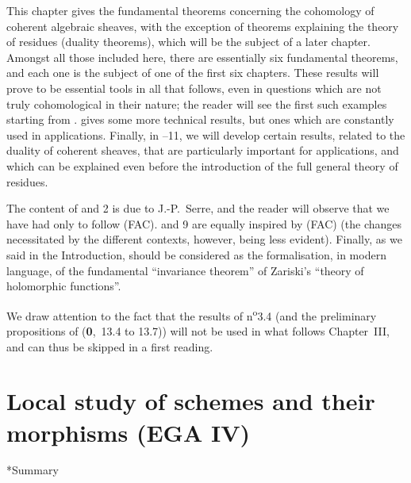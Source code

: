 \documentclass[openany,oneside]{amsbook}
\makeatletter
\theoremstyle{ega-env-style}
\theoremstyle{ega-thm-env-style}
\theoremstyle{ega-defn-env-style}
\def\section{\@startsection{section}{1}%
  \z@{.7\linespacing\@plus\linespacing}{.5\linespacing}%
  {\normalfont\bfseries\Large\scshape\centering}}
\makeatother
\begin{document}
This chapter gives the fundamental theorems concerning the cohomology of coherent algebraic sheaves, with the exception of theorems explaining the theory of residues (duality theorems), which will be the subject of a later chapter.
Amongst all those included here, there are essentially six fundamental theorems, and each one is the subject of one of the first six chapters.
These results will prove to be essential tools in all that follows, even in questions which are not truly cohomological in their nature;
the reader will see the first such examples starting from .
 gives some more technical results, but ones which are constantly used in applications.
Finally, in \textsection{}--11, we will develop certain results, related to the duality of coherent sheaves, that are particularly important for applications, and which can be explained even before the introduction of the full general theory of residues.

The content of \textsection{} and 2 is due to J.-P.~Serre, and the reader will observe that we have had only to follow (FAC).
 and 9 are equally inspired by (FAC) (the changes necessitated by the different contexts, however, being less evident).
Finally, as we said in the Introduction,  should be considered as the formalisation, in modern language, of the fundamental ``invariance theorem'' of Zariski's ``theory of holomorphic functions''.

We draw attention to the fact that the results of n\textsuperscript{o}3.4 (and the preliminary propositions of (\textbf{0},~13.4 to 13.7)) will not be used in what follows Chapter~III, and can thus be skipped in a first reading.
\bigskip












\chapter{Local study of schemes and their morphisms (EGA IV)}

\label{section:ega4}

\nocite{I-1}


\section*{Summary}
\end{document}

